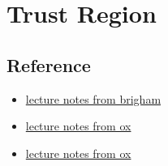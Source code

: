 \chapter{Trust Region}\label{chp:trust_region}

\section{Reference}
\begin{itemize}
    \item \href{https://acme.byu.edu/0000017a-1bb8-db63-a97e-7bfa0bd80000/vol2lab19trustregion-pdf}{lecture notes from brigham}
    \item \href{https://www.numerical.rl.ac.uk/people/nimg/course/lectures/raphael/lectures/lec6slides.4.pdf}{lecture notes from ox}
    \item \href{https://people.maths.ox.ac.uk/hauser/hauser_lecture3.pdf}{lecture notes from ox}
\end{itemize}